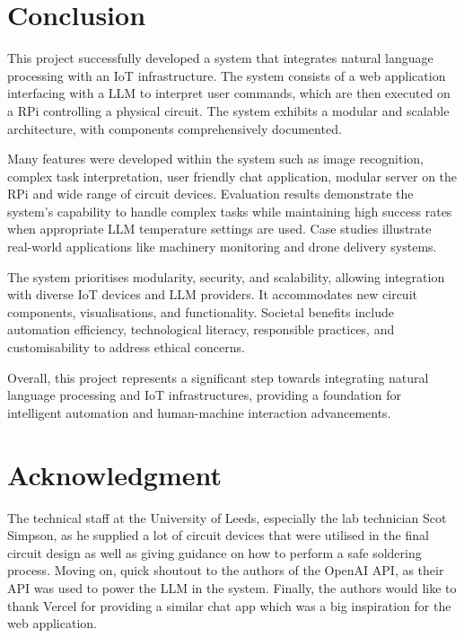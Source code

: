 \documentclass{ieeeaccess}
\begin{document}
\section{Conclusion}\label{sec:conclusion}
This project successfully developed a system that integrates natural language processing with an IoT infrastructure. The system consists of a web application interfacing with a LLM to interpret user commands, which are then executed on a RPi controlling a physical circuit. The system exhibits a modular and scalable architecture, with components comprehensively documented. 

Many features were developed within the system such as image recognition, complex task interpretation, user friendly chat application, modular server on the RPi and wide range of circuit devices. Evaluation results demonstrate the system's capability to handle complex tasks while maintaining high success rates when appropriate LLM temperature settings are used. Case studies illustrate real-world applications like machinery monitoring and drone delivery systems.

The system prioritises modularity, security, and scalability, allowing integration with diverse IoT devices and LLM providers. It accommodates new circuit components, visualisations, and functionality. Societal benefits include automation efficiency, technological literacy, responsible practices, and customisability to address ethical concerns.

Overall, this project represents a significant step towards integrating natural language processing and IoT infrastructures, providing a foundation for intelligent automation and human-machine interaction advancements. 

\section*{Acknowledgment}
The technical staff at the University of Leeds, especially the lab technician Scot Simpson, as he supplied a lot of circuit devices that were utilised in the final circuit design as well as giving guidance on how to perform a safe soldering process. Moving on, quick shoutout to the authors of the OpenAI API, as their API was used to power the LLM in the system. Finally, the authors would like to thank Vercel for providing a similar chat app which was a big inspiration for the web application.



\end{document}

